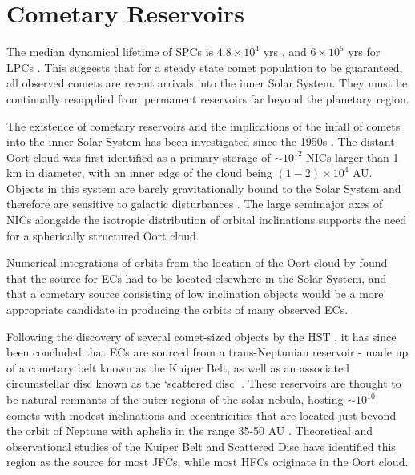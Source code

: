 
\section{Cometary Reservoirs}
\label{sec:origin_of_comets}


The median dynamical lifetime of SPCs is $4.8\times10^4$ yrs \citep{1991AJ....102..787L}, and $6\times10^5$ yrs for LPCs \citep{1979IAUS...81..277W}. This suggests that for a steady state comet population to be guaranteed, all observed comets are recent arrivals into the inner Solar System. They must be continually resupplied from permanent reservoirs far beyond the planetary region.

The existence of cometary reservoirs and the implications of the infall of comets into the inner Solar System has been investigated since the 1950s \citep{1950BAN....11...91O, 1951PNAS...37....1K}. The distant Oort cloud was first identified as a primary storage of $\sim10^{12}$ NICs larger than 1 km in diameter, with an inner edge of the cloud being $(1-2)\times10^4$ AU. Objects in this system are barely gravitationally bound to the Solar System and therefore are sensitive to galactic disturbances \citep{1981AJ.....86.1730H}. The large semimajor axes of NICs alongside the isotropic distribution of orbital inclinations supports the need for a spherically structured Oort cloud.

Numerical integrations of orbits from the location of the Oort cloud by \cite{1988ApJ...328L..69D} found that the source for ECs had to be located elsewhere in the Solar System, and that a cometary source consisting of low inclination objects would be a more appropriate candidate in producing the orbits of many observed ECs.

Following the discovery of several comet-sized objects by the HST \citep{1995ApJ...455..342C}, it has since been concluded that ECs are sourced from a trans-Neptunian reservoir - made up of a cometary belt known as the Kuiper Belt, as well as an associated circumstellar disc known as the `scattered disc' \citep{1997Sci...276.1670D}. These reservoirs are thought to be natural remnants of the outer regions of the solar nebula, hosting $\sim10^{10}$ comets with modest inclinations and eccentricities that are located just beyond the orbit of Neptune with aphelia in the range 35-50 AU \citep{1993AJ....105.1987H}. Theoretical and observational studies of the Kuiper Belt and Scattered Disc have identified this region as the source for most JFCs, while most HFCs originate in the Oort cloud.


